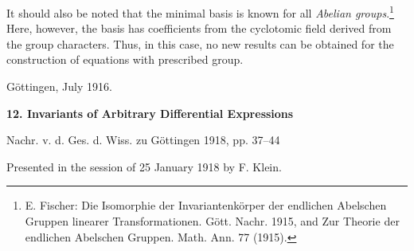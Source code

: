 \documentclass[11pt]{article}
\begin{document}
It should also be noted that the minimal basis is known for all \emph{Abelian groups}.\footnote{E. Fischer: Die Isomorphie der Invariantenkörper der endlichen Abelschen Gruppen linearer Transformationen. Gött. Nachr. 1915, and Zur Theorie der endlichen Abelschen Gruppen. Math. Ann. 77 (1915).} Here, however, the basis has coefficients from the cyclotomic field derived from the group characters. Thus, in this case, no new results can be obtained for the construction of equations with prescribed group.

Göttingen, July 1916.

\clearpage
\providecommand{\bdelta}{\bar{\delta}}
\begin{center}
{\Large\bfseries 12. Invariants of Arbitrary Differential Expressions}\par
\vspace{1.5em}
Nachr. v. d. Ges. d. Wiss. zu Göttingen 1918, pp. 37--44
\end{center}

\vspace{3em}
\begin{center}
Presented in the session of 25 January 1918 by F. Klein.
\end{center}
\end{document}
